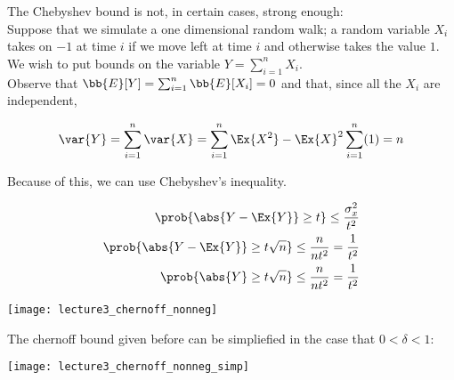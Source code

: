 \documentclass[../main.tex]{subfiles}
\begin{document}
\begin{remark}
    The Chebyshev bound is not, in certain cases, strong enough: \\

    Suppose that we simulate a one dimensional random walk; a random variable $X_{i}$
    takes on $-1$ at time $i$ if we move left at time $i$ and otherwise takes the value
    $1$. We wish to put bounds on the variable $Y = \sum_{i=1}^{n}X_{i}$. \\

    Observe that $\bb{E}[Y] = \sum_{i=1}^{n}\bb{E}[X_{i}] = 0$ and that, since all the
    $X_{i}$ are independent, 

    \[
        \var{Y} = \sum_{i=1}^{n} \var{X} = \sum_{i=1}^{n}\Ex{X^2} - \Ex{X}^2 \sum_{i=1}^{n}(1) = n
    \]

    Because of this, we can use Chebyshev's inequality. 

    \begin{align*}
        \prob{\abs{Y - \Ex{Y}} \geq t} \leq \frac{\sigma_x^2}{t^2} \\
        \prob{\abs{Y - \Ex{Y}} \geq t\sqrt{n}} \leq \frac{n}{nt^2} = \frac{1}{t^2} \\
        \prob{\abs{Y} \geq t\sqrt{n}} \leq \frac{n}{nt^2} = \frac{1}{t^2} \\
    \end{align*}
\end{remark}

\begin{center}
    \texttt{[image: lecture3\_chernoff\_nonneg]}
\end{center}

\begin{remark}
    The chernoff bound given before can be simpliefied in the case that $0 < \delta < 1$:

\begin{center}
    \texttt{[image: lecture3\_chernoff\_nonneg\_simp]}
\end{center}

\end{remark}
\end{document}
